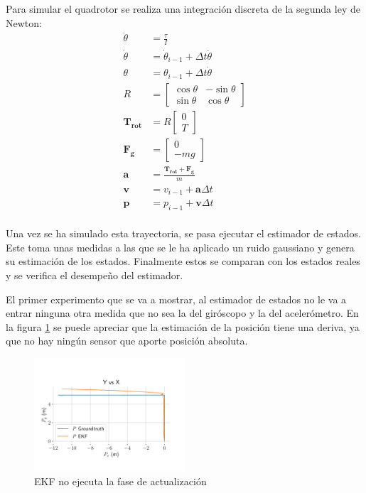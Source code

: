 Para simular el quadrotor se realiza una integración discreta de la segunda ley de Newton:
\begin{align}
        \ddot{\theta} &= \frac{\tau}{I} \\
        \dot{\theta} &= \dot{\theta}_{i-1} + \Delta t \ddot{\theta} \\
        \theta &= \theta_{i-1} + \Delta t \dot{\theta} \\
        R &= 
\begin{bmatrix}
\cos{\theta}& -\sin{\theta}\\
\sin{\theta} & \cos{\theta}
\end{bmatrix}\\
         \bm{T_{rot}}&= R  \begin{bmatrix}0\\ T \end{bmatrix}\\
         \bm{F_g}&= \begin{bmatrix}0\\ -m g \end{bmatrix}\\
         \bm{a}& = \frac{\bm{T_{rot}}+\bm{F_g}}{m}\\
         \bm{v}& = v_{i-1} + \bm{a}\Delta t  \\
        \bm{p} &= p_{i-1} + \bm{v}\Delta t  \\
\end{align}


Una vez se ha simulado esta trayectoria, se pasa ejecutar el estimador de estados. Este toma unas medidas a las que se le ha aplicado un ruido gaussiano y genera su estimación de los estados. Finalmente estos se comparan con los estados reales y se verifica el desempeño del estimador. 

El primer experimento que se va a mostrar, al estimador de estados no le va a entrar ninguna otra medida que no sea la del giróscopo y la del acelerómetro. En la figura \ref{fig:simu1} se puede apreciar que la estimación de la posición tiene una deriva, ya que no hay ningún sensor que aporte posición absoluta. 

\begin{figure}[b]
\includegraphics[width=0.5\textwidth]{estimador_px4/im_simu/n_update/tray}
\caption{EKF no ejecuta la fase de actualización}
\label{fig:simu1}
\end{figure}


